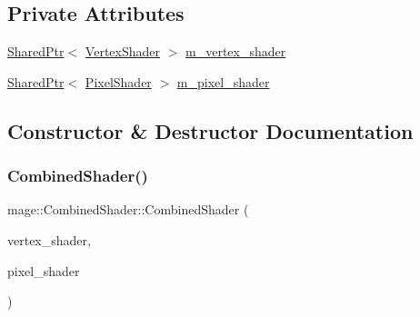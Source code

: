 \subsection*{Private Attributes}
\begin{DoxyCompactItemize}
\item 
\hyperlink{namespacemage_a1e01ae66713838a7a67d30e44c67703e}{Shared\+Ptr}$<$ \hyperlink{classmage_1_1_vertex_shader}{Vertex\+Shader} $>$ \hyperlink{structmage_1_1_combined_shader_ae70a1404acc466fc7fbcb05756140f54}{m\+\_\+vertex\+\_\+shader}
\item 
\hyperlink{namespacemage_a1e01ae66713838a7a67d30e44c67703e}{Shared\+Ptr}$<$ \hyperlink{classmage_1_1_pixel_shader}{Pixel\+Shader} $>$ \hyperlink{structmage_1_1_combined_shader_a562b58278dcb98469c98250a636c640e}{m\+\_\+pixel\+\_\+shader}
\end{DoxyCompactItemize}


\subsection{Constructor \& Destructor Documentation}
\hypertarget{structmage_1_1_combined_shader_ab9d6ce4dc9ed2602b19729ee8d126f61}{}\label{structmage_1_1_combined_shader_ab9d6ce4dc9ed2602b19729ee8d126f61} 
\subsubsection{\texorpdfstring{Combined\+Shader()}{CombinedShader()}\hspace{0.1cm}{\footnotesize\ttfamily [1/3]}}
{\footnotesize\ttfamily mage\+::\+Combined\+Shader\+::\+Combined\+Shader (\begin{DoxyParamCaption}\item[{\hyperlink{namespacemage_a1e01ae66713838a7a67d30e44c67703e}{Shared\+Ptr}$<$ \hyperlink{classmage_1_1_vertex_shader}{Vertex\+Shader} $>$}]{vertex\+\_\+shader,  }\item[{\hyperlink{namespacemage_a1e01ae66713838a7a67d30e44c67703e}{Shared\+Ptr}$<$ \hyperlink{classmage_1_1_pixel_shader}{Pixel\+Shader} $>$}]{pixel\+\_\+shader }\end{DoxyParamCaption})\hspace{0.3cm}{\ttfamily [explicit]}}

\hypertarget{structmage_1_1_combined_shader_afc4a237b78efe6b13d6e569ede301b62}{}\label{structmage_1_1_combined_shader_afc4a237b78efe6b13d6e569ede301b62} 
